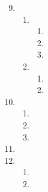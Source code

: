 \begin{enumerate}

    \setcounter{enumi}{8}

  \item

    \begin{enumerate}[label=\alph*.]

      \item 

        \begin{enumerate}[label=\arabic*.]

          \item 

          \item 

          \item 

        \end{enumerate}

      \item 

        \begin{enumerate}[label=\arabic*.]

          \item 

          \item 

        \end{enumerate}

    \end{enumerate}

    \setcounter{enumi}{5}

  \item

    \begin{enumerate}[label=\alph*]

      \item 

      \item 

      \item 

    \end{enumerate}

  \item

    \setcounter{enumi}{11}

  \item

    \begin{enumerate}[label=\alph*]

      \item 

      \item 

    \end{enumerate}

\end{enumerate}



